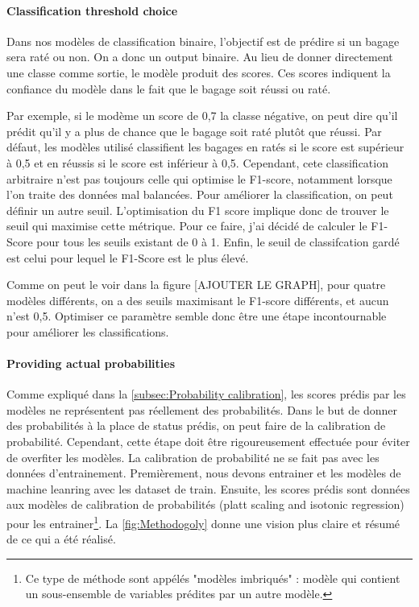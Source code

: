 \documentclass[12pt]{article}
\begin{document}
\paragraph{Classification threshold choice} 
Dans nos modèles de classification binaire, l'objectif est de prédire si un bagage sera raté ou non. On a donc un output binaire. Au lieu de donner directement une classe comme sortie, le modèle produit des scores. Ces scores indiquent la confiance du modèle dans le fait que le bagage soit réussi ou raté.
 
Par exemple, si le modème un score de 0,7 la classe négative, on peut dire qu'il prédit qu'il y a plus de chance que le bagage soit raté plutôt que réussi. Par défaut, les modèles utilisé classifient les bagages en ratés si le score est supérieur à 0,5 et en réussis si le score est inférieur à 0,5. Cependant, cete classification arbitraire n'est pas toujours celle qui optimise le F1-score, notamment lorsque l'on traite des données mal balancées. 
Pour améliorer la classification, on peut définir un autre seuil.
L'optimisation du F1 score implique donc de trouver le seuil qui maximise cette métrique. 
Pour ce faire, j'ai décidé de calculer le F1-Score pour tous les seuils existant de 0 à 1. Enfin, le seuil de classifcation gardé est celui pour lequel le F1-Score est le plus élevé.

Comme on peut le voir dans la figure [AJOUTER LE GRAPH], pour quatre modèles différents, on a des seuils maximisant le F1-score différents, et aucun n'est 0,5. Optimiser ce paramètre semble donc être une étape incontournable pour améliorer les classifications.

\paragraph{Providing actual probabilities} Comme expliqué dans la \autoref{subsec:Probability calibration}, les scores prédis par les modèles ne représentent pas réellement des probabilités. Dans le but de donner des probabilités à la place de status prédis, on peut faire de la calibration de probabilité. Cependant, cette étape doit être rigoureusement effectuée pour éviter de overfiter les modèles. \hfill \break
La calibration de probabilité ne se fait pas avec les données d'entrainement. Premièrement, nous devons entrainer et les modèles de machine leanring avec les dataset de train. Ensuite, les scores prédis sont données aux modèles de calibration de probabilités (platt scaling and isotonic regression) pour les entrainer\footnote{Ce type de méthode sont appélés "modèles imbriqués" : modèle qui contient un sous-ensemble de variables prédites par un autre modèle.}. La \autoref{fig:Methodogoly} donne une vision plus claire et résumé de ce qui a été réalisé.
\end{document}
